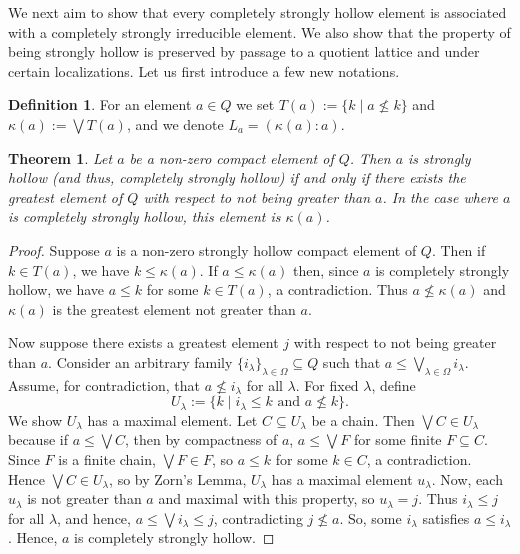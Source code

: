 \documentclass[11pt,english]{amsart}
\newtheorem{theorem}{Theorem}[section]
\theoremstyle{definition}
\newtheorem{definition}{Definition}[section]
\numberwithin{equation}{section}
\theoremstyle{remark}
\def\leq{\leqslant}
\begin{document}
	
	We next aim to show that every completely strongly hollow element is associated with a completely strongly irreducible element. We also show that the property of being strongly hollow is preserved by passage to a quotient lattice and under certain localizations. 
	Let us first introduce a few new notations.
	
	
	
	\begin{definition}
		For an element $a \in Q$ we set $T(a) := \{k \mid a \nleq k \}$ and $\kappa(a) := \bigvee T(a)$, and we denote $L_a=(\kappa(a):a)$.
	\end{definition}
	
	\begin{theorem}\label{T2.7}
		Let $a$ be a non-zero compact element of $Q$. Then $a$ is strongly hollow (and thus, completely strongly hollow) if and only if there exists the greatest element of $Q$ with respect to not being greater than $a$. In the case where $a$ is completely strongly hollow, this element is $\kappa(a)$.
	\end{theorem}
    
	\begin{proof}
		Suppose $a$ is a non-zero strongly hollow compact element of $Q$. Then if $k \in T(a)$, we have $k \leq \kappa(a)$. If $a \leq \kappa(a)$ then, since $a$ is completely strongly hollow, we have $a \leq k$ for some $k \in T(a)$, a contradiction. Thus $a \nleq \kappa(a)$ and $\kappa(a)$ is the greatest element not greater than $a$.
		
		Now suppose there exists a greatest element $j$ with respect to not being greater than $a$. Consider an arbitrary family $\{i_\lambda\}_{\lambda \in \Omega}\subseteq Q$ such that $a \leq \bigvee_{\lambda \in \Omega} i_\lambda$. Assume, for contradiction, that $a \nleq i_\lambda$ for all $\lambda$. For fixed $\lambda$, define
		\[
		U_\lambda := \{ k \mid i_\lambda \leq k \text{ and } a \nleq k \}.
		\]
		We show $U_\lambda$ has a maximal element. Let $C \subseteq U_\lambda$ be a chain. Then $\bigvee C \in U_\lambda$ because if $a \leq \bigvee C$, then by compactness of $a$, $a \leq \bigvee F$ for some finite $F \subseteq C$. Since $F$ is a finite chain, $\bigvee F \in F$, so $a \leq k$ for some $k \in C$, a contradiction. Hence $\bigvee C \in U_\lambda$, so by Zorn’s Lemma, $U_\lambda$ has a maximal element $u_\lambda$.
		Now, each $u_\lambda$ is not greater than $a$ and maximal with this property, so $u_\lambda = j$. Thus $i_\lambda \leq j$ for all $\lambda$, and hence, $a \leq \bigvee i_\lambda \leq j$, contradicting $j \nleq a$. So, some $i_\lambda$ satisfies $a \leq i_\lambda$. Hence, $a$ is completely strongly hollow.
	\end{proof}
	
\end{document}
